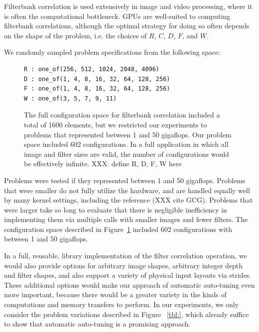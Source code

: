 \documentclass{sig-alternate}
\begin{document}
Filterbank correlation is used extensively in image and video processing,
where it is often the computational bottleneck.
GPUs are well-suited to computing filterbank correlations, although the
optimal strategy for doing so often depends on the shape of the problem, i.e.
the choices of $R$, $C$, $D$, $F$, and $W$.

We randomly sampled problem specifications from the following space:
\begin{figure}
\begin{center}
\begin{minipage}{.4\textwidth}
\begin{verbatim}
R : one_of(256, 512, 1024, 2048, 4096)
D : one_of(1, 4, 8, 16, 32, 64, 128, 256)
F : one_of(1, 4, 8, 16, 32, 64, 128, 256)
W : one_of(3, 5, 7, 9, 11)
\end{verbatim}
\end{minipage}
\end{center}
\caption{The full configuration space for filterbank correlation included a
total of 1600 elements, but we restricted our experiments to problems that
represented between 1 and 50 gigaflops. Our problem space included 602
configurations. In a full application in which all image and filter sizes are
valid, the number of configurations would be effectively infinite.
XXX: define R, D, F, W here
}
\label{fig:probspace}
\end{figure}
Problems were tested if they represented between 1 and 50 gigaflops.  Problems
that were smaller do not fully utilize the hardware, and are handled equally
well by many kernel settings, including the reference (XXX cite GCG).
Problems that were larger take so long to evaluate that there is negligible
inefficiency in implementing them via multiple calls with smaller images and fewer filters.
The configuration space described in Figure~\ref{fig:probspace} included 602
configurations with between 1 and 50 gigaflops.

In a full, reusable, library implementation of the filter correlation
operation, we would also provide options for arbitrary image shapes,
arbitrary integer depth and filter shapes, and also support a variety of
physical input layouts via strides.  These additional options would make our
approach of automatic auto-tuning even more important, because there would be
a greater variety in the kinds of computations and memory transfers to
perform.  In our experiments, we only consider the problem variations
described in Figure ~\ref{tbl:}, which already suffice to show that automatic
auto-tuning is a promising approach.
\end{document}
